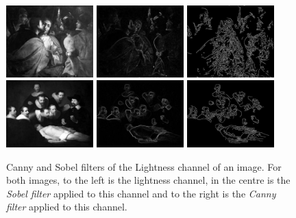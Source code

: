 \documentclass[11pt,a4paper,twoside,openright,draft]{report}
\begin{document}
\begin{multicols}{2}
\begin{figure}[tbp]
\centering
\includegraphics[width=0.30\textwidth]{L_caravaggio_1962_139_1}
\includegraphics[width=0.30\textwidth]{sobel_L_caravaggio_1962_139_1}
\includegraphics[width=0.30\textwidth]{canny_L_caravaggio_1962_139_1}
\includegraphics[width=0.30\textwidth]{L_rembrandt_eu_464}
\includegraphics[width=0.30\textwidth]{sobel_L_rembrandt_eu_464}
\includegraphics[width=0.30\textwidth]{canny_L_rembrandt_eu_464}
\caption[Canny and Sobel filters of Lightness]{Canny and Sobel filters of the
Lightness channel of an image.  For both images, to the left is the lightness
channel, in the centre is the \emph{Sobel filter} applied to this channel and
to the right is the \emph{Canny filter} applied to this channel.}
\label{fig:cannysobell}
\end{figure}


\end{multicols}
\end{document}
